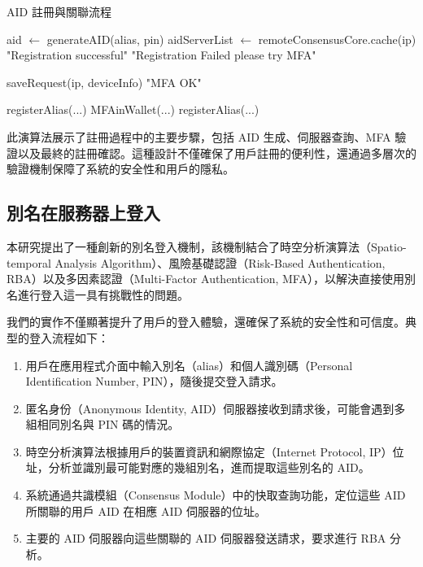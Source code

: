 \begin{algorithm}
  \caption{AID 註冊與關聯流程}
  \begin{algorithmic}[1]
    \State aid $\gets$ generateAID(alias, pin)
    \State aidServerList $\gets$ remoteConsensusCore.cache(ip)
    \State \Return "Registration successful"
    \EndIf
    \EndFor
    \State \Return "Registration Failed please try MFA"
    \EndFunction

    \State saveRequest(ip, deviceInfo)
    \State \Return "MFA OK"
    \EndFunction

    \State registerAlias(...) 
    \State MFAinWallet(...) 
    \State registerAlias(...) 
    \EndFunction
  \end{algorithmic}
\end{algorithm}

此演算法展示了註冊過程中的主要步驟，包括 AID 生成、伺服器查詢、MFA 驗證以及最終的註冊確認。這種設計不僅確保了用戶註冊的便利性，還通過多層次的驗證機制保障了系統的安全性和用戶的隱私。

\subsection{別名在服務器上登入}

本研究提出了一種創新的別名登入機制，該機制結合了時空分析演算法（Spatio-temporal Analysis Algorithm）、風險基礎認證（Risk-Based Authentication, RBA）以及多因素認證（Multi-Factor Authentication, MFA），以解決直接使用別名進行登入這一具有挑戰性的問題。

我們的實作不僅顯著提升了用戶的登入體驗，還確保了系統的安全性和可信度。典型的登入流程如下：
\begin{enumerate}
  \item 用戶在應用程式介面中輸入別名（alias）和個人識別碼（Personal Identification Number, PIN），隨後提交登入請求。
  \item 匿名身份（Anonymous Identity, AID）伺服器接收到請求後，可能會遇到多組相同別名與 PIN 碼的情況。
  \item 時空分析演算法根據用戶的裝置資訊和網際協定（Internet Protocol, IP）位址，分析並識別最可能對應的幾組別名，進而提取這些別名的 AID。
  \item 系統通過共識模組（Consensus Module）中的快取查詢功能，定位這些 AID 所關聯的用戶 AID 在相應 AID 伺服器的位址。
  \item 主要的 AID 伺服器向這些關聯的 AID 伺服器發送請求，要求進行 RBA 分析。
\end{enumerate}

